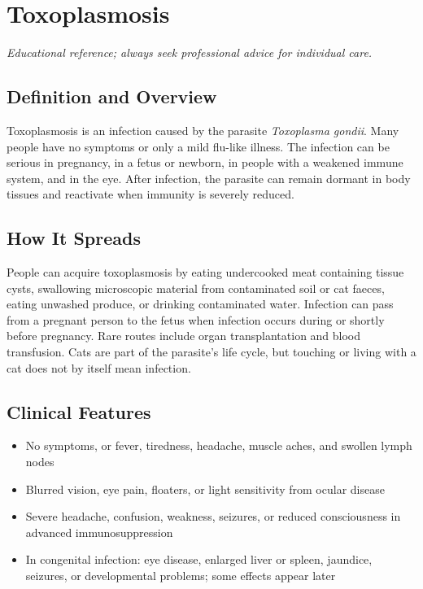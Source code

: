 \chapter{Toxoplasmosis}
\medskip
\noindent\textit{Educational reference; always seek professional advice for individual care.}

\section*{Definition and Overview}
Toxoplasmosis is an infection caused by the parasite \textit{Toxoplasma gondii}. Many people have no symptoms or only a mild flu-like illness. The infection can be serious in pregnancy, in a fetus or newborn, in people with a weakened immune system, and in the eye. After infection, the parasite can remain dormant in body tissues and reactivate when immunity is severely reduced.

\section*{How It Spreads}
People can acquire toxoplasmosis by eating undercooked meat containing tissue cysts, swallowing microscopic material from contaminated soil or cat faeces, eating unwashed produce, or drinking contaminated water. Infection can pass from a pregnant person to the fetus when infection occurs during or shortly before pregnancy. Rare routes include organ transplantation and blood transfusion. Cats are part of the parasite's life cycle, but touching or living with a cat does not by itself mean infection.

\section*{Clinical Features}
\begin{itemize}
    \item No symptoms, or fever, tiredness, headache, muscle aches, and swollen lymph nodes
    \item Blurred vision, eye pain, floaters, or light sensitivity from ocular disease
    \item Severe headache, confusion, weakness, seizures, or reduced consciousness in advanced immunosuppression
    \item In congenital infection: eye disease, enlarged liver or spleen, jaundice, seizures, or developmental problems; some effects appear later
\end{itemize}

